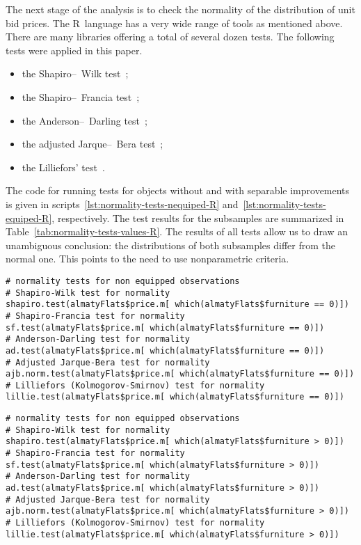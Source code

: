 \documentclass[]{scrreprt}
\begin{document}
The next stage of the analysis is to check the normality of the distribution of unit bid prices. The R~language has a very wide range of tools as mentioned above. There are many libraries offering a total of several dozen tests. The following tests were applied in this paper.
\begin{itemize}
	\item the Shapiro--~Wilk test~\cite{Shapiro-Wilk-test};
	\item the Shapiro--~Francia test~\cite{Shapiro-Francia-test};
	\item the Anderson--~Darling test~\cite{Anderson-Darling-test};
	\item the adjusted Jarque--~Bera test~\cite{Jarque-Bera-test};
	\item the Lilliefors' test~\cite{Liliefors-normality-test}.
\end{itemize}
The code for running tests for objects without and with separable improvements is given in scripts~\ref{lst:normality-tests-nequiped-R} and~\ref{lst:normality-tests-equiped-R}, respectively. The test results for the subsamples are summarized in Table~\ref{tab:normality-tests-values-R}. The results of all tests allow us to draw an unambiguous conclusion: the distributions of both subsamples differ from the normal one. This points to the need to use nonparametric criteria.
%
\begin{lstlisting}[float=htp, caption = Performing normality tests for observations without separable improvements and chattels, firstnumber=1, label= lst:normality-tests-nequiped-R]
# normality tests for non equipped observations
# Shapiro-Wilk test for normality
shapiro.test(almatyFlats$price.m[ which(almatyFlats$furniture == 0)])
# Shapiro-Francia test for normality
sf.test(almatyFlats$price.m[ which(almatyFlats$furniture == 0)])
# Anderson-Darling test for normality
ad.test(almatyFlats$price.m[ which(almatyFlats$furniture == 0)])
# Adjusted Jarque-Bera test for normality
ajb.norm.test(almatyFlats$price.m[ which(almatyFlats$furniture == 0)])
# Lilliefors (Kolmogorov-Smirnov) test for normality
lillie.test(almatyFlats$price.m[ which(almatyFlats$furniture == 0)])
\end{lstlisting}
%
\begin{lstlisting}[float=htp, caption = Performing normality tests for observations with separable improvements and chattels, firstnumber=1, label= lst:normality-tests-equiped-R]
# normality tests for non equipped observations
# Shapiro-Wilk test for normality
shapiro.test(almatyFlats$price.m[ which(almatyFlats$furniture > 0)])
# Shapiro-Francia test for normality
sf.test(almatyFlats$price.m[ which(almatyFlats$furniture > 0)])
# Anderson-Darling test for normality
ad.test(almatyFlats$price.m[ which(almatyFlats$furniture > 0)])
# Adjusted Jarque-Bera test for normality
ajb.norm.test(almatyFlats$price.m[ which(almatyFlats$furniture > 0)])
# Lilliefors (Kolmogorov-Smirnov) test for normality
lillie.test(almatyFlats$price.m[ which(almatyFlats$furniture > 0)])
\end{lstlisting}
%
\end{document}
